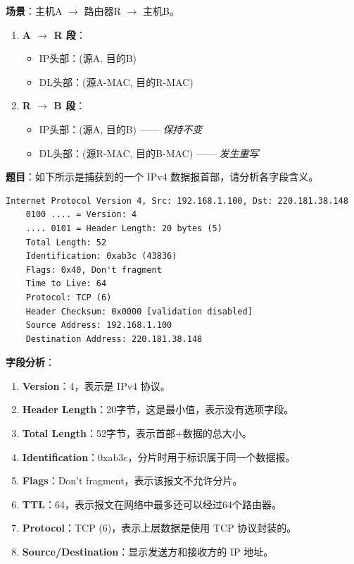 \begin{examplebox}[例题4.11 地址变化过程]
\textbf{场景}：主机A $\to$ 路由器R $\to$ 主机B。
\tcblower
\begin{enumerate}[itemsep=0pt]
    \item \textbf{A $\to$ R 段}：
    \begin{itemize}[itemsep=0pt]
        \item IP头部：(源A, 目的B) 
        \item DL头部：(源A-MAC, 目的R-MAC)
    \end{itemize}
    \item \textbf{R $\to$ B 段}：
    \begin{itemize}[itemsep=0pt]
        \item IP头部：(源A, 目的B) —— \textit{保持不变}
        \item DL头部：(源R-MAC, 目的B-MAC) —— \textit{发生重写}
    \end{itemize}
\end{enumerate}
\end{examplebox}

\begin{examplebox}
\textbf{题目}：如下所示是捕获到的一个 IPv4 数据报首部，请分析各字段含义。
\begin{lstlisting}[basicstyle=\ttfamily\footnotesize]
Internet Protocol Version 4, Src: 192.168.1.100, Dst: 220.181.38.148
    0100 .... = Version: 4
    .... 0101 = Header Length: 20 bytes (5)
    Total Length: 52
    Identification: 0xab3c (43836)
    Flags: 0x40, Don't fragment
    Time to Live: 64
    Protocol: TCP (6)
    Header Checksum: 0x0000 [validation disabled]
    Source Address: 192.168.1.100
    Destination Address: 220.181.38.148
\end{lstlisting}
\tcblower
\textbf{字段分析}：
\begin{enumerate}[itemsep=0pt]
    \item \textbf{Version}：4，表示是 IPv4 协议。
    \item \textbf{Header Length}：20字节，这是最小值，表示没有选项字段。
    \item \textbf{Total Length}：52字节，表示首部+数据的总大小。
    \item \textbf{Identification}：0xab3c，分片时用于标识属于同一个数据报。
    \item \textbf{Flags}：Don't fragment，表示该报文不允许分片。
    \item \textbf{TTL}：64，表示报文在网络中最多还可以经过64个路由器。
    \item \textbf{Protocol}：TCP (6)，表示上层数据是使用 TCP 协议封装的。
    \item \textbf{Source/Destination}：显示发送方和接收方的 IP 地址。
\end{enumerate}
\end{examplebox}

